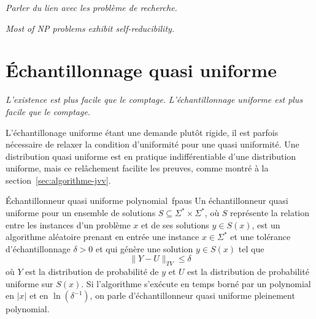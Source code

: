 \textcolor{mydarkred}{\textit{Parler du lien avec les problème de recherche.}}

\textcolor{mydarkred}{\textit{Most of NP problems exhibit self-reducibility.}}


\section{Échantillonnage quasi uniforme}

\textcolor{mydarkred}{\textit{L'existence est plus facile que le comptage.}}
\textcolor{mydarkred}{\textit{L'échantillonnage uniforme est plus facile que le comptage.}}


L'échantillonage uniforme étant une demande plutôt rigide, il est parfois nécessaire de relaxer la condition d'uniformité pour une quasi uniformité. Une distribution quasi uniforme est en pratique indifférentiable d'une distribution uniforme, mais ce relâchement facilite les preuves, comme montré à la section~\ref{sec:algorithme-jvv}.

\begin{maindefinition}{Échantillonneur quasi uniforme polynomial~\cite{jerrumCountingSamplingIntegrating2003}}{fpaus}
    Un échantillonneur quasi uniforme pour un ensemble de solutions $S \subseteq \Sigma^{*} \times \Sigma^{*}$, où $S$ représente la relation entre les instances d'un problème $x$ et de ses solutions $y \in  S(x)$, est un algorithme aléatoire prenant en entrée une instance $x \in \Sigma^{*}$ et une tolérance d'échantillonnage $\delta > 0$ et qui génère une solution $y \in S(x)$ tel que
    \begin{equation*}
        \lVert Y - U \rVert_{TV} \leq \delta 
    \end{equation*}
    où $Y$ est la distribution de probabilité de $y$ et $U$ est la distribution de probabilité uniforme sur $S(x)$. Si l'algorithme s'exécute en temps borné par un polynomial en $\lvert x \rvert$ et en $\ln (\delta^{-1})$, on parle d'échantillonneur quasi uniforme pleinement polynomial.
\end{maindefinition}

